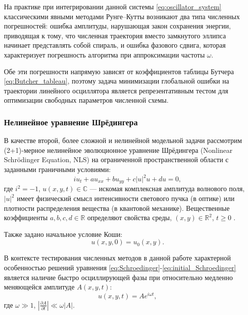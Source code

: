 На практике при интегрировании данной системы \eqref{eq:oscillator_system} классическими явными методами Рунге--Кутты возникают два типа численных погрешностей: ошибка амплитуды, нарушающая закон сохранения энергии, приводящая к тому, что численная траектория вместо замкнутого эллипса начинает представлять собой спираль, и ошибка фазового сдвига, которая характеризует погрешность алгоритма при аппроксимации частоты $\omega$. 

Обе эти погрешности напрямую зависят от коэффициентов таблицы Бутчера \eqref{eq:Butcher_tableau}, поэтому задача минимизации глобальной ошибки на траектории линейного осциллятора является репрезентативным тестом для оптимизации свободных параметров численной схемы.

\subsubsection{Нелинейное уравнение Шрёдингера}
В качестве второй, более сложной и нелинейной модельной задачи рассмотрим (2+1)-мерное нелинейное эволюционное уравнение Шрёдингера (Nonlinear Schrödinger Equation, NLS) на ограниченной пространственной области с заданными граничными условиями:
\begin{equation} \label{eq:Schroedinger}
	i u_t + au_{xx} + bu_{yy} + c|u|^2 u + du = 0,
\end{equation}
где $i^2 = -1$, $u(x, y, t) \in \mathbb{C}$ — искомая комплексная амплитуда волнового поля, $|u|^2$ имеет физический смысл интенсивности светового пучка (в оптике) или плотности распределения вещества (в квантовой механике). Вещественные коэффициенты $a, b, c, d \in \mathbb{R}$ определяют свойства среды, $(x, y) \in \mathbb{R}^2$, $t \geqslant 0$ .

\smallskip
Также задано начальное условие Коши:
\begin{equation} \label{eq:initial_Schroedinger}
	u(x, y, 0) = u_0(x, y).
\end{equation}

В контексте тестирования численных методов в данной работе характерной особенностью решений уравнения \eqref{eq:Schroedinger}-\eqref{eq:initial_Schroedinger} является наличие быстро осциллирующей фазы при относительно медленно меняющейся амплитуде $A(x, y, t)$:
\begin{equation*}
	u(x,y,t) = A e^{i\omega t},
\end{equation*}
где $\omega \gg 1$, $\left| \frac{\partial A}{\partial t} \right | \ll \omega |A|$. 

